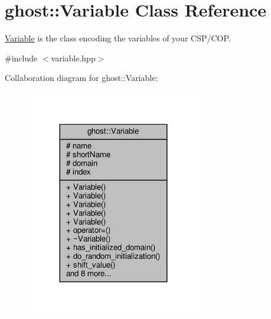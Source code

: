 \hypertarget{classghost_1_1Variable}{\section{ghost\-:\-:Variable Class Reference}
\label{classghost_1_1Variable}
}


\hyperlink{classghost_1_1Variable}{Variable} is the class encoding the variables of your C\-S\-P/\-C\-O\-P.  




{\ttfamily \#include $<$variable.\-hpp$>$}



Collaboration diagram for ghost\-:\-:Variable\-:
\nopagebreak
\begin{figure}[H]
\begin{center}
\leavevmode
\includegraphics[width=216pt]{classghost_1_1Variable__coll__graph}
\end{center}
\end{figure}
